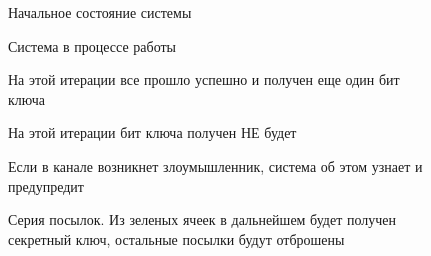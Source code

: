   \begin{figure}[h]
  \caption{Начальное состояние системы}
  \end{figure}
  
  \begin{figure}[h]
  \caption{Система в процессе работы}
  \end{figure}
  
  \begin{figure}[h]
  \caption{На этой итерации все прошло успешно и получен еще один бит ключа}
  \end{figure}
  
  \begin{figure}[h]
  \caption{На этой итерации бит ключа получен НЕ будет}
  \end{figure}
  
  \begin{figure}[h]
  \caption{Если в канале возникнет злоумышленник, система об этом узнает и предупредит}
  \end{figure}
  
  \begin{figure}[h]
  \caption{Серия посылок. Из зеленых ячеек в дальнейшем будет получен секретный ключ, остальные посылки будут отброшены}
  \end{figure}


